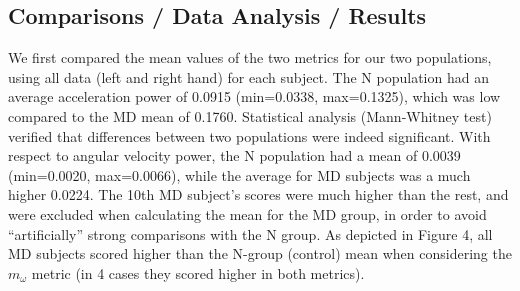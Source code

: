 \subsection{Comparisons / Data Analysis / Results}
\label{subsec:SmartCT1Results}
We first compared the mean values of the two metrics for our two populations, using all data (left and right hand) for each subject. The N population had an average acceleration power of 0.0915 (min=0.0338, max=0.1325), which was low compared to the MD mean of 0.1760. Statistical analysis (Mann-Whitney test) verified that differences between two populations were indeed significant. With respect to angular velocity power, the N population had a mean of 0.0039 (min=0.0020, max=0.0066), while the average for MD subjects was a much higher 0.0224. The 10th MD subject’s scores were much higher than the rest, and were excluded when calculating the mean for the MD group, in order to avoid “artificially” strong comparisons with the N group. As depicted in Figure 4, all MD subjects scored higher than the N-group (control) mean when considering the $m_{\omega}$ metric (in 4 cases they scored higher in both metrics).
